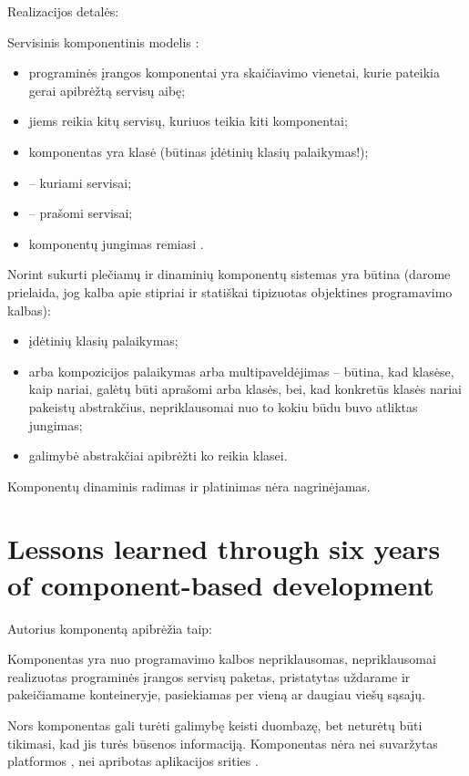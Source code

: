 \begin{note}
  Realizacijos detalės:

  Servisinis komponentinis modelis :
  \begin{itemize}
    \item programinės įrangos komponentai yra skaičiavimo vienetai, kurie
      pateikia gerai apibrėžtą servisų aibę;
    \item jiems reikia kitų servisų, kuriuos teikia kiti komponentai;
    \item komponentas yra klasė (būtinas įdėtinių klasių palaikymas!);
    \item {} – kuriami servisai;
    \item {} – prašomi servisai;
    \item komponentų jungimas remiasi .
  \end{itemize}

  Norint sukurti plečiamų  ir dinaminių  komponentų
  sistemas yra būtina (darome prielaida, jog kalba apie stipriai
   ir statiškai  tipizuotas objektines
  programavimo kalbas):
  \begin{itemize}
    \item įdėtinių  klasių palaikymas;
    \item {} arba  kompozicijos palaikymas arba
      multipaveldėjimas – būtina, kad klasėse, kaip nariai, galėtų
      būti aprašomi  arba klasės, bei, kad konkretūs klasės
      nariai pakeistų abstrakčius, nepriklausomai nuo to kokiu būdu
      buvo atliktas jungimas;
    \item galimybė abstrakčiai apibrėžti ko reikia klasei.
  \end{itemize}
\end{note}

\begin{note}
  Komponentų dinaminis radimas ir platinimas nėra nagrinėjamas.
\end{note}

\section{Lessons learned through six years of component-based development}

Autorius komponentą apibrėžia taip\cite{Sparling:2000:LLT:352183.352202}:
\begin{defn}[Komponentas]
  Komponentas yra nuo programavimo kalbos nepriklausomas, nepriklausomai
  realizuotas programinės įrangos servisų paketas, pristatytas
  uždarame  ir pakeičiamame konteineryje, pasiekiamas
  per vieną ar daugiau viešų sąsajų.

  Nors komponentas gali turėti galimybę keisti duombazę, bet neturėtų
  būti tikimasi, kad jis turės būsenos informaciją. Komponentas nėra
  nei suvaržytas platformos , nei apribotas
  aplikacijos srities .
\end{defn}

